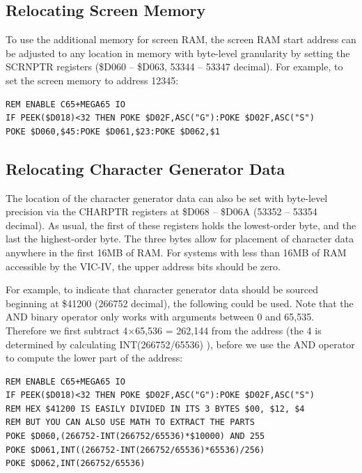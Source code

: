 \subsection{Relocating Screen Memory}

To use the additional memory for screen RAM, the screen RAM start address can be adjusted to any location in memory with byte-level granularity by setting the SCRNPTR registers (\$D060 -- \$D063, 53344 -- 53347 decimal).  For example, to set the screen memory to address 12345:

\begin{tcolorbox}[colback=black,coltext=white]
\verbatimfont{\codefont}
\begin{verbatim}
REM ENABLE C65+MEGA65 IO
IF PEEK($D018)<32 THEN POKE $D02F,ASC("G"):POKE $D02F,ASC("S")
POKE $D060,$45:POKE $D061,$23:POKE $D062,$1
\end{verbatim}
\end{tcolorbox}

\subsection{Relocating Character Generator Data}

The location of the character generator data can also be set with byte-level precision via the CHARPTR registers at \$D068 -- \$D06A (53352 -- 53354 decimal). As usual, the first of these registers holds the lowest-order byte, and the last the highest-order byte. The three bytes allow for placement of character data anywhere in the first 16MB of RAM. For systems with less than 16MB of RAM accessible by the VIC-IV, the upper address bits should be zero.

For example, to indicate that character generator data should be sourced beginning at \$41200 (266752 decimal), the following
could be used.  Note that the AND binary operator only works with arguments between 0 and 65,535. Therefore we first
subtract 4$\times$65,536 = 262,144 from the address (the 4 is determined by calculating INT(266752/65536) ), before we use the AND operator to compute the lower part of the address:

\begin{tcolorbox}[colback=black,coltext=white]
\verbatimfont{\codefont}
\begin{verbatim}
REM ENABLE C65+MEGA65 IO
IF PEEK($D018)<32 THEN POKE $D02F,ASC("G"):POKE $D02F,ASC("S")
REM HEX $41200 IS EASILY DIVIDED IN ITS 3 BYTES $00, $12, $4
REM BUT YOU CAN ALSO USE MATH TO EXTRACT THE PARTS
POKE $D060,(266752-INT(266752/65536)*$10000) AND 255
POKE $D061,INT((266752-INT(266752/65536)*65536)/256)
POKE $D062,INT(266752/65536)
\end{verbatim}
\end{tcolorbox}


